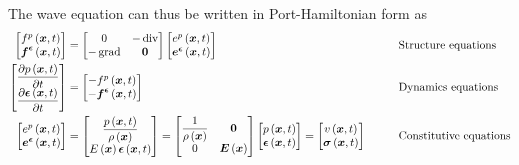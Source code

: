 The wave equation can thus be written in Port-Hamiltonian form as
\begin{equation}
  \begin{aligned}
    \begin{bmatrix}
       f^{p}\left(  \boldsymbol{x} ,t \right)  \\
        \boldsymbol{f} ^{ \boldsymbol{\epsilon} }\left(  \boldsymbol{x} ,t \right) 
    \end{bmatrix}&=\begin{bmatrix}
    0 & -\operatorname{div} \\
    -\operatorname{grad} &  \boldsymbol{0} 
    \end{bmatrix}\begin{bmatrix}
       e^{p}\left(  \boldsymbol{x} ,t \right)  \\
        \boldsymbol{e} ^{ \boldsymbol{\epsilon} }\left(  \boldsymbol{x} ,t \right) 
    \end{bmatrix}&\qquad&\text{Structure equations}\\
    \begin{bmatrix}
       \dfrac{\partial  p\left(  \boldsymbol{x} ,t \right) }{\partial t}  \\
       \dfrac{\partial   \boldsymbol{\epsilon} \left(  \boldsymbol{x} ,t \right) }{\partial t}       
    \end{bmatrix}&=\begin{bmatrix}
      - f^{p}\left(  \boldsymbol{x} ,{t} \right)  \\
      -  \boldsymbol{f} ^{ \boldsymbol{\epsilon} }\left(  \boldsymbol{x} ,{t} \right)  \\          
    \end{bmatrix}&\qquad&\text{Dynamics equations}\\
    \begin{bmatrix}
       e^{p}\left(  \boldsymbol{x} ,t \right) \\
        \boldsymbol{e} ^{ \boldsymbol{\epsilon} }\left(  \boldsymbol{x} ,t \right) \\
    \end{bmatrix}&=\begin{bmatrix}
      \dfrac{ p\left(  \boldsymbol{x} ,t \right) }{ \rho\left(  \boldsymbol{x}  \right) }\\
       E\left(  \boldsymbol{x}  \right)   \boldsymbol{\epsilon} \left(  \boldsymbol{x} ,t \right) 
    \end{bmatrix}=\begin{bmatrix}
      \dfrac{1}{ \rho\left(  \boldsymbol{x}  \right) } &  \boldsymbol{0}  \\
      0 &   \boldsymbol{E} \left(  \boldsymbol{x}  \right) 
    \end{bmatrix}\begin{bmatrix}
       p\left(  \boldsymbol{x} ,t \right)  \\
        \boldsymbol{\epsilon} \left(  \boldsymbol{x} ,t \right) 
    \end{bmatrix}=\begin{bmatrix}
     v\left(  \boldsymbol{x} ,t \right) \\
     \boldsymbol{\mathit{\sigma}}\left(  \boldsymbol{x} ,t \right) 
    \end{bmatrix}&\qquad&\text{Constitutive equations}
  \end{aligned}
\end{equation}

